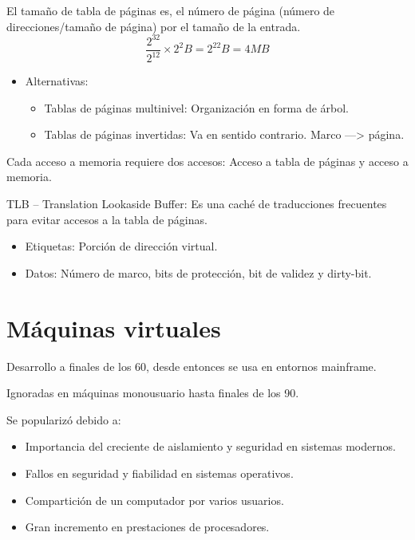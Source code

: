 \documentclass[12pt, twoside, openright]{report} %
\begin{document}
  El tamaño de tabla de páginas es, el número de página (número de
  direcciones/tamaño de página) por el tamaño de la entrada.
$$\frac{2^{32}}{2^{12}} \times 2^2 B = 2^22 B = 4 MB$$
  \begin{itemize}
    \item Alternativas:
    \begin{itemize}
      \item Tablas de páginas multinivel: Organización en forma de árbol.
      \item Tablas de páginas invertidas: Va en sentido contrario. Marco —> página.
    \end{itemize}
    
  \end{itemize}

  
    Cada acceso a memoria requiere dos accesos: Acceso a tabla de
    páginas y acceso a memoria.

    TLB -- Translation Lookaside Buffer: Es una caché de traducciones
    frecuentes para evitar accesos a la tabla de páginas.

    \begin{itemize}
    
    \item
      Etiquetas: Porción de dirección virtual.
    \item
      Datos: Número de marco, bits de protección, bit de validez y
      dirty-bit.
    \end{itemize}

    \pagebreak
\section{Máquinas virtuales}

    Desarrollo a finales de los 60, desde entonces se usa en entornos
    mainframe.

    
  Ignoradas en máquinas monousuario hasta finales de los 90.

  
    Se popularizó debido a:
    \vspace{-0.5cm}

    \begin{itemize}
    
    \item
      Importancia del creciente de aislamiento y seguridad en sistemas
      modernos.
    \item
      Fallos en seguridad y fiabilidad en sistemas operativos.
    \item
      Compartición de un computador por varios usuarios.
    \item
      Gran incremento en prestaciones de procesadores.
    \end{itemize}
\end{document}
